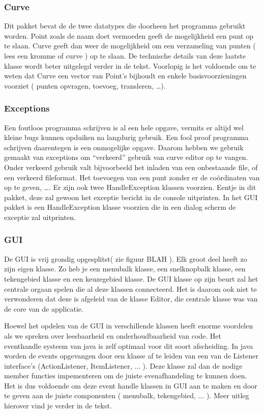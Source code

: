 \documentclass[a4paper,11pt,oneside, titlepage]{article}
\begin{document}
\subsubsection{Curve}
Dit pakket bevat de de twee datatypes die doorheen het programma gebruikt worden. Point zoals
de naam doet vermoeden geeft de mogelijkheid een punt op te slaan. Curve geeft dan weer de
mogelijkheid om een verzameling van punten ( lees een kromme of curve ) op te slaan. De
technische details van deze laatste klasse wordt beter uitgelegd verder in de tekst. 
Voorlopig is het voldoende om te weten dat Curve een vector van Point's bijhoudt en enkele
basisvoorzieningen voorziet ( punten opvragen, toevoeg, transleren, \ldots ).
\subsubsection{Exceptions}
Een foutloos programma schrijven is al een hele opgave, vermits er altijd wel kleine bugs
kunnen opduiken na langdurig gebruik. Een fool proof programma schrijven daarentegen is een
onmogelijke opgave. Daarom hebben we gebruik gemaakt van exceptions om ``verkeerd'' gebruik van
curve editor op te vangen. Onder verkeerd gebruik valt bijvoorbeeld het inladen van een
onbestaande file, of een verkeerd fileformat. Het toevoegen van een punt zonder er de 
co\"ordinaten van op te geven, \ldots.\newline \newline
Er zijn ook twee HandleException klassen voorzien. Eentje in dit pakket, deze zal gewoon 
het exceptie bericht in de console uitprinten. In het GUI pakket is een HandleException klasse
voorzien die in een dialog scherm de exceptie zal uitprinten.
\subsubsection{GUI}
De GUI is vrij grondig opgesplitst( zie figuur BLAH ). Elk groot deel heeft zo zijn eigen klasse.
Zo heb je een menubalk klasse, een snelknopbalk klasse, een tekengebied klasse en een keuzegebied
klasse. De GUI klasse op zijn beurt zal het centrale orgaan spelen die al deze klassen 
connecteerd. Het is daarom ook niet te verwonderen dat deze is afgeleid van de klasse Editor,
die centrale klasse was van de core van de applicatie. 

Hoewel het opdelen van de GUI in verschillende klassen heeft enorme voordelen als we spreken 
over leesbaarheid en onderhoudbaarheid van code. Het eventhandle systeem van java is zelf
optimaal voor dit soort afscheiding. In java worden de events opgevangen door een klasse 
af te leiden van een van de Listener interface's (ActionListener, ItemListener, ... ). Deze 
klasse zal dan de nodige member functies impementeren om de juiste evenafhandeling te kunnen
doen. Het is dus voldoende om deze event handle klassen in GUI aan te maken en door te geven
aan de juiste componenten ( menubalk, tekengebied, ... ). Meer uitleg hierover vind je verder in
de tekst.
\end{document}
